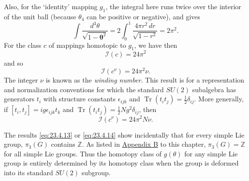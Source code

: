 Also, for the `identity' mapping $g_1$, the integral here runs twice over
the interior of the unit ball (because $\theta_4$ can be positive or
negative), and gives
\[
\int\frac{d^3\theta}{\sqrt{1-\boldsymbol{\theta}^2}}
=2\int_0^1\frac{4\pi r^2\,dr}{\sqrt{1-r^2}}=2\pi^2.
\]
For the class $c$ of mappings homotopic to $g_1$, we have then
\begin{equation}
\mathcal I(c)=24\pi^2
\tag{23.4.12}\label{eq:23.4.12}
\end{equation}
and so
\begin{equation}
\mathcal I(c^\nu)=24\pi^2\nu.
\tag{23.4.13}\label{eq:23.4.13}
\end{equation}
The integer $\nu$ is known as the \emph{winding number}. This result is
for a representation and normalization conventions for which the
standard $SU(2)$ subalgebra has generators $t_i$ with structure constants
$\epsilon_{ijk}$ and $\operatorname{Tr}(t_it_j)=\frac12\delta_{ij}$. More
generally, if $[t_i,t_j]=ig\epsilon_{ijk}t_k$ and
$\operatorname{Tr}(t_it_j)=\frac12Ng^2\delta_{ij}$, then
\begin{equation}
\mathcal I(c^\nu)=24\pi^2N\nu.
\tag{23.4.14}\label{eq:23.4.14}
\end{equation}

The results \eqref{eq:23.4.13} or \eqref{eq:23.4.14} show incidentally
that for every simple Lie group, $\pi_3(G)$ contains $\mathbb{Z}$. As listed in
\hyperref[app:23.B]{Appendix B} to this chapter, $\pi_3(G)=\mathbb{Z}$ for all simple Lie groups. Thus
the homotopy class of $g(\theta)$ for any simple Lie group is entirely
determined by its homotopy class when the group is deformed into its
standard $SU(2)$ subgroup.
